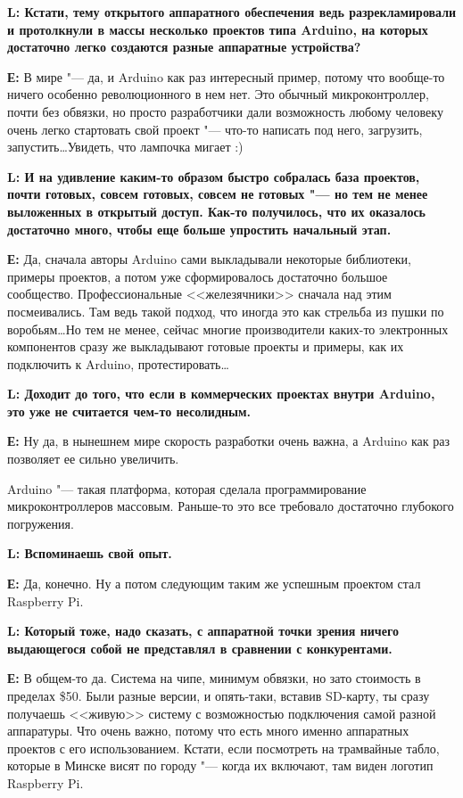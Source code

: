 \documentclass[10pt, a5paper]{article}
\begin{document}
{\noindent \bf L: Кстати, тему открытого аппаратного обеспечения ведь разрекламировали и протолкнули в массы несколько проектов типа Arduino, на которых достаточно легко  создаются разные аппаратные устройства?}

{\noindent \bf Е:} В мире "--- да, и Arduino как раз интересный пример, потому что вообще-то ничего особенно революционного в нем нет. Это обычный микроконтроллер, почти без обвязки, но просто разработчики дали возможность любому человеку очень легко стартовать свой проект "--- что-то написать под него, загрузить, запустить\ldots Увидеть, что лампочка мигает :)

{\noindent \bf L: И на удивление каким-то образом быстро собралась база проектов, почти готовых, совсем готовых, совсем не готовых "--- но тем не менее выложенных в открытый доступ. Как-то получилось, что их оказалось достаточно много, чтобы еще больше упростить начальный этап.}

{\noindent \bf Е:} Да, сначала авторы Arduino сами выкладывали некоторые библиотеки, примеры проектов, а потом уже сформировалось достаточно большое сообщество. Профессиональные <<железячники>> сначала над этим посмеивались. Там ведь такой подход, что иногда это как стрельба из пушки по воробьям\ldots Но тем не менее, сейчас многие производители каких-то электронных компонентов сразу же выкладывают готовые проекты и примеры, как их подключить к Arduino, протестировать\ldots


{\noindent \bf L: Доходит до того, что если в коммерческих проектах внутри Arduino, это уже не считается чем-то несолидным.}

{\noindent \bf Е:} Ну да, в нынешнем мире скорость разработки очень важна, а Arduino как раз позволяет ее сильно увеличить.

Arduino "--- такая платформа, которая сделала программирование микроконтроллеров массовым. Раньше-то это все требовало достаточно  глубокого погружения.

{\noindent \bf L: Вспоминаешь свой опыт.}

{\noindent \bf Е:} Да, конечно. Ну а потом следующим таким же успешным проектом стал Raspberry Pi. 


{\noindent \bf L: Который тоже, надо сказать, с аппаратной точки зрения ничего выдающегося собой не представлял в сравнении с конкурентами.}

{\noindent \bf Е:} В общем-то да. Система на чипе, минимум обвязки, но зато стоимость в пределах \$50. Были разные версии, и опять-таки, вставив SD-карту, ты сразу получаешь <<живую>> систему с возможностью подключения самой разной аппаратуры.  Что очень важно, потому что есть много именно аппаратных проектов с его использованием. Кстати, если посмотреть на трамвайные табло, которые в Минске висят по городу "--- когда их включают, там виден логотип Raspberry Pi.
\end{document}
